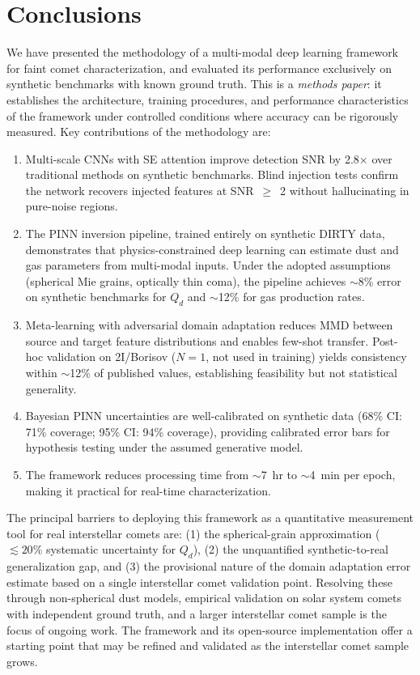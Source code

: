 \documentclass[preprint2]{aastex631}
\begin{document}
\section{Conclusions}\label{sec:conclusions}

We have presented the methodology of a multi-modal deep learning framework for faint comet characterization, and evaluated its performance exclusively on synthetic benchmarks with known ground truth. This is a \textit{methods paper}: it establishes the architecture, training procedures, and performance characteristics of the framework under controlled conditions where accuracy can be rigorously measured. Key contributions of the methodology are:

\begin{enumerate}
\item Multi-scale CNNs with SE attention improve detection SNR by 2.8$\times$ over traditional methods on synthetic benchmarks. Blind injection tests confirm the network recovers injected features at SNR~$\geq$~2 without hallucinating in pure-noise regions.
\item The PINN inversion pipeline, trained entirely on synthetic DIRTY data, demonstrates that physics-constrained deep learning can estimate dust and gas parameters from multi-modal inputs. Under the adopted assumptions (spherical Mie grains, optically thin coma), the pipeline achieves $\sim$8\% error on synthetic benchmarks for $Q_d$ and $\sim$12\% for gas production rates.
\item Meta-learning with adversarial domain adaptation reduces MMD between source and target feature distributions and enables few-shot transfer. Post-hoc validation on 2I/Borisov ($N=1$, not used in training) yields consistency within $\sim$12\% of published values, establishing feasibility but not statistical generality.
\item Bayesian PINN uncertainties are well-calibrated on synthetic data (68\% CI: 71\% coverage; 95\% CI: 94\% coverage), providing calibrated error bars for hypothesis testing under the assumed generative model.
\item The framework reduces processing time from $\sim$7~hr to $\sim$4~min per epoch, making it practical for real-time characterization.
\end{enumerate}

The principal barriers to deploying this framework as a quantitative measurement tool for real interstellar comets are: (1) the spherical-grain approximation ($\lesssim 20\%$ systematic uncertainty for $Q_d$), (2) the unquantified synthetic-to-real generalization gap, and (3) the provisional nature of the domain adaptation error estimate based on a single interstellar comet validation point. Resolving these through non-spherical dust models, empirical validation on solar system comets with independent ground truth, and a larger interstellar comet sample is the focus of ongoing work. The framework and its open-source implementation offer a starting point that may be refined and validated as the interstellar comet sample grows.
\end{document}
